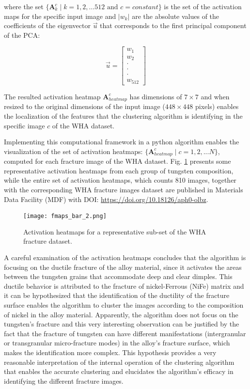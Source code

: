 \documentclass[authoryear,preprint,review,12pt, singleside]{elsarticle}
\begin{document}
where the set  $\{\textbf{A}^c_k \; | \;  k=1,2, ... 512 \text{ and } c=constant\}$ is the set of the activation maps for the specific input image and  $|w_k|$ are the absolute values of the coefficients of the eigenvector $\vec{u}$ that corresponds to the first principal component of the PCA:

\begin{equation*}
\vec{u} = \begin{bmatrix}  w_1 \\
						   w_2 \\
						  \cdot \\
						  \cdot \\
						  \cdot \\
						  w_{512}
		   \end{bmatrix}
\end{equation*}

The resulted activation heatmap $\textbf{A}_{heatmap}^c$ has dimensions of $7 \times 7$ and when resized to the original dimensions of the input image ($448 \times 448$ pixels) enables the localization of the features that the clustering algorithm is identifying in the specific image $c$ of the WHA dataset.

Implementing this computational framework in a python algorithm enables the visualization of the set of activation heatmaps: $\{\textbf{A}_{heatmap}^c \; | \; c=1,2, ... N\}$, computed for each fracture image of the WHA dataset. Fig. \ref{fig:activ_maps} presents some representative activation heatmaps from each group of tungsten composition, while the entire set of activation heatmaps, which counts 810 images, together with the corresponding WHA fracture images dataset are published in Materials Data Facility (MDF) with DOI: \url{https://doi.org/10.18126/aph0-olbz}. 


\begin{figure}[H]
	\centering
	\texttt{[image: fmaps\_bar\_2.png]}
	\caption{Activation heatmaps for a representative sub-set of the WHA fracture dataset.}
	\label{fig:activ_maps}
\end{figure} 


A careful examination of the activation heatmaps concludes that the algorithm is focusing on the ductile fracture of the alloy material, since it activates the areas between the tungsten grains that accommodate deep and clear dimples. This ductile behavior is  attributed to the fracture of nickel-Ferrous (NiFe) matrix and it can be hypothesized that the identification of the ductility of the fracture surface enables the algorithm to cluster the images according to the composition of nickel in the alloy material. Apparently, the algorithm does not focus on the tungsten's fracture and this very interesting observation can be justified by the fact that the fracture of tungsten can have different manifestations (intergranular or transgranular micro-fracture modes) in the alloy's fracture surface, which makes the identification more complex. This hypothesis provides a very reasonable interpretation of the internal operation of the clustering algorithm that enables the accurate clustering and elucidates the algorithm's efficacy in identifying the different fracture images. 
\end{document}

